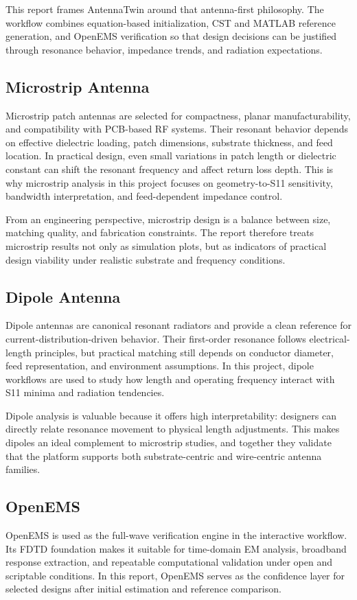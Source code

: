 \documentclass[12pt,a4paper]{article}
\begin{document}
This report frames AntennaTwin around that antenna-first philosophy. The workflow combines equation-based initialization, CST and MATLAB reference generation, and OpenEMS verification so that design decisions can be justified through resonance behavior, impedance trends, and radiation expectations.

\subsection{Microstrip Antenna}
Microstrip patch antennas are selected for compactness, planar manufacturability, and compatibility with PCB-based RF systems. Their resonant behavior depends on effective dielectric loading, patch dimensions, substrate thickness, and feed location. In practical design, even small variations in patch length or dielectric constant can shift the resonant frequency and affect return loss depth. This is why microstrip analysis in this project focuses on geometry-to-S11 sensitivity, bandwidth interpretation, and feed-dependent impedance control.

From an engineering perspective, microstrip design is a balance between size, matching quality, and fabrication constraints. The report therefore treats microstrip results not only as simulation plots, but as indicators of practical design viability under realistic substrate and frequency conditions.

\subsection{Dipole Antenna}
Dipole antennas are canonical resonant radiators and provide a clean reference for current-distribution-driven behavior. Their first-order resonance follows electrical-length principles, but practical matching still depends on conductor diameter, feed representation, and environment assumptions. In this project, dipole workflows are used to study how length and operating frequency interact with S11 minima and radiation tendencies.

Dipole analysis is valuable because it offers high interpretability: designers can directly relate resonance movement to physical length adjustments. This makes dipoles an ideal complement to microstrip studies, and together they validate that the platform supports both substrate-centric and wire-centric antenna families.

\subsection{OpenEMS}
OpenEMS is used as the full-wave verification engine in the interactive workflow. Its FDTD foundation makes it suitable for time-domain EM analysis, broadband response extraction, and repeatable computational validation under open and scriptable conditions. In this report, OpenEMS serves as the confidence layer for selected designs after initial estimation and reference comparison.
\end{document}
